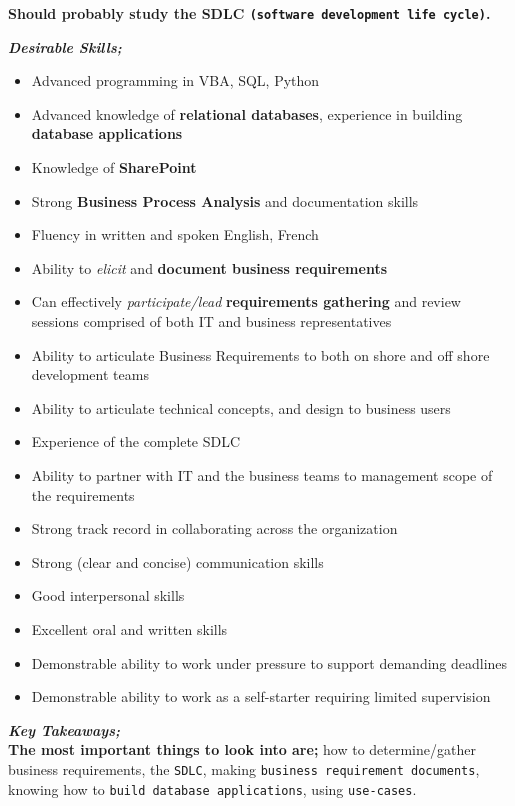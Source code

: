 \documentclass{article}
\begin{document}
\textbf{Should probably study the SDLC \texttt{(software development life cycle)}.} \\

\vspace{0.7cm}

\textbf{\textit{Desirable Skills;}}

\begin{itemize}
    \item Advanced programming in VBA, SQL, Python
    \item Advanced knowledge of \textbf{relational databases}, experience in building \textbf{database applications}
    \item Knowledge of \textbf{SharePoint}
    \item Strong \textbf{Business Process Analysis} and documentation skills
    \item Fluency in written and spoken English, French
    \item Ability to \textit{elicit} and \textbf{document business requirements}
    \item Can effectively \textit{participate/lead} \textbf{requirements gathering} and review sessions comprised of both IT and business representatives
    \item Ability to articulate Business Requirements to both on shore and off shore development teams
    \item Ability to articulate technical concepts, and design to business users
    \item Experience of the complete SDLC 
    \item Ability to partner with IT and the business teams to management scope of the requirements
    \item Strong track record in collaborating across the organization
    \item Strong (clear and concise) communication skills
    \item Good interpersonal skills
    \item Excellent oral and written skills
    \item Demonstrable ability to work under pressure to support demanding deadlines
    \item Demonstrable ability to work as a self-starter requiring limited supervision
\end{itemize}

\textit{\textbf{Key Takeaways;}} \\

\textbf{The most important things to look into are;} how to determine/gather business requirements, the \texttt{SDLC}, making \texttt{business requirement documents}, knowing how to \texttt{build database applications}, using \texttt{use-cases}. \\
\end{document}
